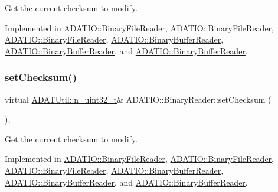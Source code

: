 Get the current checksum to modify. 



Implemented in \mbox{\hyperlink{classADATIO_1_1BinaryFileReader_a9279d31577b7fffa174df067c72ebcc4}{A\+D\+A\+T\+I\+O\+::\+Binary\+File\+Reader}}, \mbox{\hyperlink{classADATIO_1_1BinaryFileReader_a9279d31577b7fffa174df067c72ebcc4}{A\+D\+A\+T\+I\+O\+::\+Binary\+File\+Reader}}, \mbox{\hyperlink{classADATIO_1_1BinaryFileReader_a9279d31577b7fffa174df067c72ebcc4}{A\+D\+A\+T\+I\+O\+::\+Binary\+File\+Reader}}, \mbox{\hyperlink{classADATIO_1_1BinaryBufferReader_a3976e5ece3392d04158307f864a84bb7}{A\+D\+A\+T\+I\+O\+::\+Binary\+Buffer\+Reader}}, \mbox{\hyperlink{classADATIO_1_1BinaryBufferReader_a3976e5ece3392d04158307f864a84bb7}{A\+D\+A\+T\+I\+O\+::\+Binary\+Buffer\+Reader}}, and \mbox{\hyperlink{classADATIO_1_1BinaryBufferReader_a3976e5ece3392d04158307f864a84bb7}{A\+D\+A\+T\+I\+O\+::\+Binary\+Buffer\+Reader}}.

\mbox{\label{classADATIO_1_1BinaryReader_a33d291f073bf2e1f71f6bdbe40ce343a}} 
\subsubsection{\texorpdfstring{setChecksum()}{setChecksum()}\hspace{0.1cm}{\footnotesize\ttfamily [3/3]}}
{\footnotesize\ttfamily virtual \mbox{\hyperlink{namespaceADATUtil_ad945a8afa4db2d1f89b731964adae97e}{A\+D\+A\+T\+Util\+::n\+\_\+uint32\+\_\+t}}\& A\+D\+A\+T\+I\+O\+::\+Binary\+Reader\+::set\+Checksum (\begin{DoxyParamCaption}{ }\end{DoxyParamCaption})\hspace{0.3cm}{\ttfamily [protected]}, {}}



Get the current checksum to modify. 



Implemented in \mbox{\hyperlink{classADATIO_1_1BinaryFileReader_a9279d31577b7fffa174df067c72ebcc4}{A\+D\+A\+T\+I\+O\+::\+Binary\+File\+Reader}}, \mbox{\hyperlink{classADATIO_1_1BinaryFileReader_a9279d31577b7fffa174df067c72ebcc4}{A\+D\+A\+T\+I\+O\+::\+Binary\+File\+Reader}}, \mbox{\hyperlink{classADATIO_1_1BinaryFileReader_a9279d31577b7fffa174df067c72ebcc4}{A\+D\+A\+T\+I\+O\+::\+Binary\+File\+Reader}}, \mbox{\hyperlink{classADATIO_1_1BinaryBufferReader_a3976e5ece3392d04158307f864a84bb7}{A\+D\+A\+T\+I\+O\+::\+Binary\+Buffer\+Reader}}, \mbox{\hyperlink{classADATIO_1_1BinaryBufferReader_a3976e5ece3392d04158307f864a84bb7}{A\+D\+A\+T\+I\+O\+::\+Binary\+Buffer\+Reader}}, and \mbox{\hyperlink{classADATIO_1_1BinaryBufferReader_a3976e5ece3392d04158307f864a84bb7}{A\+D\+A\+T\+I\+O\+::\+Binary\+Buffer\+Reader}}.



